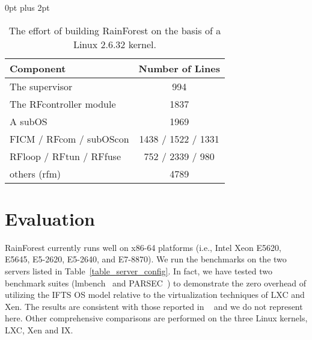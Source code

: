 \documentclass[pageno]{jpaper}
\begin{document}
\begin{table}[h]
\renewcommand{\arraystretch}{1.1}
\setlength{\abovecaptionskip}{3pt}
\setlength{\belowcaptionskip}{0pt}
\setlength{\textfloatsep} {0pt plus 2pt}
\setlength{\tabcolsep}{5pt}
\caption{The effort of building RainForest on the basis of a Linux 2.6.32 kernel.}
\centering
\begin{lrbox}{\tablebox}
\begin{tabular}{l|c}
 \hline
 \textbf{Component} & \textbf{Number of Lines}\\ \hline
The supervisor & 994 \\
 The RFcontroller module & 1837 \\
 A subOS & 1969 \\
FICM / RFcom / subOScon &  1438 / 1522 / 1331 \\
 RFloop / RFtun / RFfuse & 752 / 2339 / 980 \\
others (rfm) & 4789\\
 \hline
\end{tabular}
\label{refactoring_efforts}
\end{lrbox}
\scalebox{0.8}{\usebox{\tablebox}}
\end{table}




\section{Evaluation}\label{section_evaluation}
RainForest currently runs well on x86-64 platforms (i.e., Intel Xeon E5620, E5645, E5-2620, E5-2640, and E7-8870). We run the benchmarks on the two servers listed in Table~\ref{table_server_config}. In fact, we have tested two benchmark suites (lmbench~\cite{staelin2002lmbench3} and PARSEC~\cite{bienia2008parsec}) to demonstrate the zero overhead of utilizing the IFTS OS model relative to the virtualization techniques of LXC and Xen. The results are consistent with those reported in ~\cite{soltesz2007container} and we do not represent here. Other comprehensive comparisons are performed on the three Linux kernels, LXC, Xen and IX.
\end{document}
